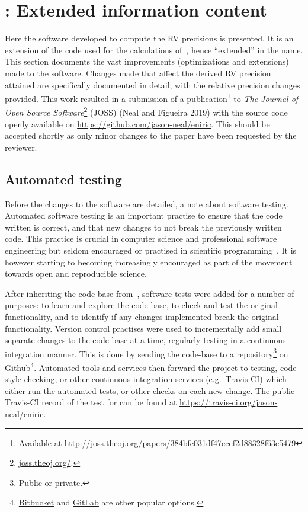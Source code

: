 
\section{\eniric{}: Extended \nir{} information content}
\label{sec:eniric}
Here the software developed to compute the {RV} precisions is presented.
It is an extension of the code used for the calculations of~\citet{figueira_radial_2016}, hence ``extended'' in the name.
This section documents the vast improvements (optimizations and extensions) made to the software.
Changes made that affect the derived {RV} precision attained are specifically documented in detail, with the relative precision changes provided.
This work resulted in a submission of a publication\footnote{Available at \href{http://joss.theoj.org/papers/384bfc031df47ecef2d88328f63e5479}{http://joss.theoj.org/papers/384bfc031df47ecef2d88328f63e5479}} to \emph{The Journal of Open Source Software}\footnote{\href{http://joss.theoj.org/}{joss.theoj.org/}.} (JOSS) (Neal and Figueira 2019) with the source code openly available on \href{Github}{https://github.com/jason-neal/eniric}. This should be accepted shortly as only minor changes to the paper have been requested by the reviewer.


\subsection{Automated testing}
\label{subsec:automated_testing}
Before the changes to the software are detailed, a note about software testing.
Automated software testing is an important practise to ensure that the code written is correct, and that new changes to not break the previously written code.
This practice is crucial in computer science and professional software engineering but seldom encouraged or practised in scientific programming~\citep{storer_bridging_2017}.
It is however starting to becoming increasingly encouraged as part of the movement towards open and reproducible science.

After inheriting the code-base from~\citet{figueira_radial_2016}, software tests were added for a number of purposes: to learn and explore the code-base, to check and test the original functionality, and to identify if any changes implemented break the original functionality.
Version control practises were used to incrementally add small separate changes to the code base at a time, regularly testing in a continuous integration manner.
This is done by sending the code-base to a repository\footnote{Public or private.} on Github\footnote{\href{https://bitbucket.org}{Bitbucket} and \href{https://gitlab.com}{GitLab} are other popular options.}.
Automated tools and services then forward the project to testing, code style checking, or other continuous-integration services (e.g.\ \href{https://travis-ci.com}{Travis-CI}) which either run the automated tests, or other checks on each new change.
The public Travis-CI record of the test for \eniric{} can be found at \href{https://travis-ci.org/jason-neal/eniric}{https://travis-ci.org/jason-neal/eniric}.

